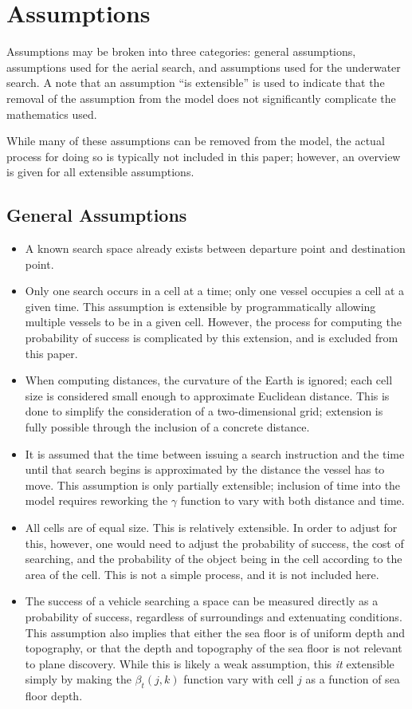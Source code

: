 \section{Assumptions}

Assumptions may be broken into three categories: general assumptions, assumptions used for the aerial search, and assumptions used for the underwater search. A note that an assumption ``is extensible'' is used to indicate that the removal of the assumption from the model does not significantly complicate the mathematics used.

While many of these assumptions can be removed from the model, the actual process for doing so is typically not included in this paper; however, an overview is given for all extensible assumptions.

\subsection{General Assumptions}

\begin{itemize}
\item A known search space already exists between departure point and destination point.
\item Only one search occurs in a cell at a time; only one vessel occupies a cell at a given time. This assumption is extensible by programmatically allowing multiple vessels to be in a given cell. However, the process for computing the probability of success is complicated by this extension, and is excluded from this paper.
\item When computing distances, the curvature of the Earth is ignored; each cell size is considered small enough to approximate Euclidean distance. This is done to simplify the consideration of a two-dimensional grid; extension is fully possible through the inclusion of a concrete distance.  
\item It is assumed that the time between issuing a search instruction and the time until that search begins is approximated by the distance the vessel has to move. This assumption is only partially extensible; inclusion of time into the model requires reworking the $\gamma$ function to vary with both distance and time.
\item All cells are of equal size. This is relatively extensible. In order to adjust for this, however, one would need to adjust the probability of success, the cost of searching, and the probability of the object being in the cell according to the area of the cell. This is not a simple process, and it is not included here.
\item The success of a vehicle searching a space can be measured directly as a probability of success, regardless of surroundings and extenuating conditions. This assumption also implies that either the sea floor is of uniform depth and topography, or that the depth and topography of the sea floor is not relevant to plane discovery. While this is likely a weak assumption, this \textit{it} extensible simply by making the $\beta_t(j,k)$ function vary with cell $j$ as a function of sea floor depth.
\end{itemize}


